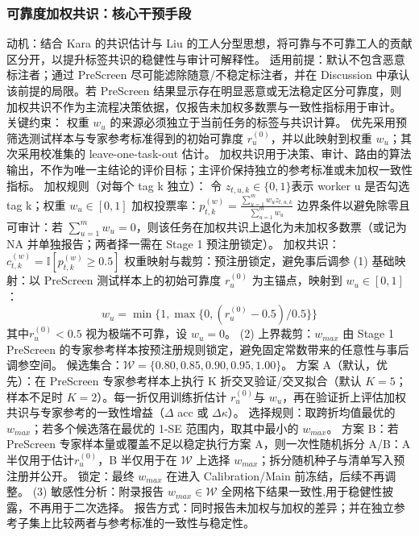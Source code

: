 \documentclass[journal,onecolumn]{IEEEtran}
\begin{document}
\subsubsection{可靠度加权共识：核心干预手段}
动机：结合 Kara 的共识估计与 Liu 的工人分型思想，将可靠与不可靠工人的贡献区分开，以提升标签共识的稳健性与审计可解释性。
适用前提：默认不包含恶意标注者；通过 PreScreen 尽可能滤除随意/不稳定标注者，并在 Discussion 中承认该前提的局限。若 PreScreen 结果显示存在明显恶意或无法稳定区分可靠度，则加权共识不作为主流程决策依据，仅报告未加权多数票与一致性指标用于审计。
关键约束：
权重 $w_u$ 的来源必须独立于当前任务的标签与共识计算。
优先采用预筛选测试样本与专家参考标准得到的初始可靠度 $r_u^{\left(0\right)}$，并以此映射到权重 $w_u$；其次采用校准集的 leave-one-task-out 估计。
加权共识用于决策、审计、路由的算法输出，不作为唯一主结论的评价目标；主评价保持独立的参考标准或未加权一致性指标。
加权规则（对每个 tag k 独立）：
令 $z_{t,u,k}\in\{0,1\}$表示 worker u 是否勾选 tag k；权重 $w_u\in\left[0,1\right]$
加权投票率：$p_{t,k}^{\left(w\right)}=\frac{\sum_{u=1}^{m}{w_uz_{t,u,k}}}{\sum_{u=1}^{m}w_u}$
边界条件以避免除零且可审计：若 $\sum_{u=1}^{m}w_u=0$，则该任务在加权共识上退化为未加权多数票（或记为 NA 并单独报告；两者择一需在 Stage 1 预注册锁定）。
加权共识：$c_{t,k}^{\left(w\right)}=\mathbb{I}\left[p_{t,k}^{\left(w\right)}\geq0.5\right]$
权重映射与裁剪：预注册锁定，避免事后调参
(1) 基础映射：以 PreScreen 测试样本上的初始可靠度 $r_u^{\left(0\right)}$ 为主锚点，映射到 $w_u\in\left[0,1\right]$：
\[w_u=\min{\{}1,\max{\{}0,\left(r_u^{\left(0\right)}-0.5\right)/0.5\}\}\]
其中$r_u^{\left(0\right)}<0.5$ 视为极端不可靠，设 $w_u=0$。
(2) 上界裁剪：$w_{max}$ 由 Stage 1 PreScreen 的专家参考样本按预注册规则锁定，避免固定常数带来的任意性与事后调参空间。
候选集合：$\mathcal{W}=\{0.80,0.85,0.90,0.95,1.00\}$。
方案 A（默认，优先）：在 PreScreen 专家参考样本上执行 K 折交叉验证/交叉拟合（默认 $K=5$；样本不足时 $K=2$）。每一折仅用训练折估计 $r_u^{\left(0\right)}$与 $w_u$，再在验证折上评估加权共识与专家参考的一致性增益（$\Delta$ acc 或 $\Delta\kappa$）。
选择规则：取跨折均值最优的 $w_{max}$；若多个候选落在最优的 1-SE 范围内，取其中最小的 $w_{max}$。
方案 B：若 PreScreen 专家样本量或覆盖不足以稳定执行方案 A，则一次性随机拆分 A/B：A 半仅用于估计$r_u^{\left(0\right)}$，B 半仅用于在 $\mathcal{W}$ 上选择 $w_{max}$；拆分随机种子与清单写入预注册并公开。
锁定：最终 $w_{max}$ 在进入 Calibration/Main 前冻结，后续不再调整。
(3) 敏感性分析：附录报告 $w_{max}\in\mathcal{W}$ 全网格下结果一致性,用于稳健性披露，不再用于二次选择。
报告方式：同时报告未加权与加权的差异；并在独立参考子集上比较两者与参考标准的一致性与稳定性。
\end{document}
